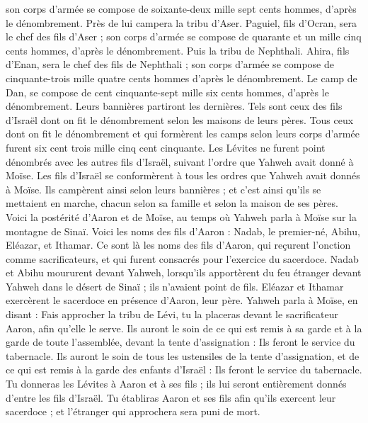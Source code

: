 \begin{multicols}{2}
son corps d’armée se compose de soixante-deux mille sept cents hommes, d’après le dénombrement.
Près de lui campera la tribu d'Aser. Paguiel, fils d'Ocran, sera le chef des fils d'Aser ;
son corps d’armée se compose de quarante et un mille cinq cents hommes, d’après le dénombrement.
Puis la tribu de Nephthali. Ahira, fils d’Enan, sera le chef des fils de Nephthali ;
son corps d’armée se compose de cinquante-trois mille quatre cents hommes d’après le dénombrement.
Le camp de Dan, se compose de cent cinquante-sept mille six cents hommes, d’après le dénombrement. Leurs bannières partiront les dernières.
Tels sont ceux des fils d'Israël dont on fit le dénombrement selon les maisons de leurs pères. Tous ceux dont on fit le dénombrement et qui formèrent les camps selon leurs corps d’armée furent six cent trois mille cinq cent cinquante.
Les Lévites ne furent point dénombrés avec les autres fils d'Israël, suivant l’ordre que Yahweh avait donné à Moïse.
Les fils d'Israël se conformèrent à tous les ordres que Yahweh avait donnés à Moïse. Ils campèrent ainsi selon leurs bannières ; et c’est ainsi qu’ils se mettaient en marche, chacun selon sa famille et selon la maison de ses pères.
\VerseOne{}Voici la postérité d'Aaron et de Moïse, au temps où Yahweh parla à Moïse sur la montagne de Sinaï.
Voici les noms des fils d'Aaron : Nadab, le premier-né, Abihu, Eléazar, et Ithamar.
Ce sont là les noms des fils d'Aaron, qui reçurent l’onction comme sacrificateurs, et qui furent consacrés pour l’exercice du sacerdoce.
Nadab et Abihu moururent devant Yahweh, lorsqu’ils apportèrent du feu étranger devant Yahweh dans le désert de Sinaï ; ils n'avaient point de fils. Eléazar et Ithamar exercèrent le sacerdoce en présence d'Aaron, leur père.
Yahweh parla à Moïse, en disant :
Fais approcher la tribu de Lévi, tu la placeras devant le sacrificateur Aaron, afin qu'elle le serve.
Ils auront le soin de ce qui est remis à sa garde et à la garde de toute l’assemblée, devant la tente d'assignation : Ils feront le service du tabernacle.
Ils auront le soin de tous les ustensiles de la tente d'assignation, et de ce qui est remis à la garde des enfants d'Israël : Ils feront le service du tabernacle.
Tu donneras les Lévites à Aaron et à ses fils ; ils lui seront entièrement donnés d'entre les fils d'Israël.
Tu établiras Aaron et ses fils afin qu’ils exercent leur sacerdoce ; et l’étranger qui approchera sera puni de mort.

\end{multicols}
